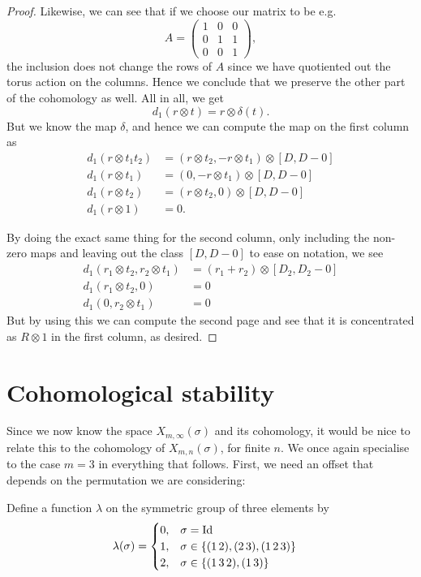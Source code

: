 \begin{proof}
  Likewise, we can see that if we choose our matrix to be e.g.
  \[ A = \begin{pmatrix}
    1 & 0 & 0 \\
    0 & 1 & 1 \\
    0 & 0 & 1
  \end{pmatrix}, \]
  the inclusion does not change the rows of $A$ since we have
  quotiented out the torus action on the columns. Hence we conclude
  that we preserve the other part of the cohomology as well. All in
  all, we get
  \[ d_1(r\otimes t) = r \otimes \delta(t). \]
  But we know the map $\delta$, and hence we can compute the map on
  the first
  column as
  \begin{align*}
    d_1(r \otimes t_1t_2) &= ( r\otimes t_2, - r\otimes t_1) \otimes
    [D,D-0] \\
    d_1(r \otimes t_1) &= (0, -r\otimes t_1) \otimes [D,D-0] \\
    d_1(r \otimes t_2) &= (r\otimes t_2,0) \otimes [D,D-0] \\
    d_1(r \otimes 1) &= 0.
  \end{align*}

  By doing the exact same thing for the second column, only including
  the non-zero maps and leaving out
  the class $[D,D-0]$ to ease on notation, we see
  \begin{align*}
    d_1( r_1\otimes t_2, r_2\otimes t_1) &= (r_1 + r_2) \otimes
                                           [D_2,D_2-0] \\
    d_1( r_1 \otimes t_2, 0) &= 0 \\
    d_1( 0, r_2\otimes t_1) &= 0
  \end{align*} 
  But by using this we can compute the second page and see that it is
  concentrated as $R\otimes 1$ in the first column, as desired.
\end{proof}


\section{Cohomological stability}
\label{sec:costa}
Since we now know the space $X_{m,\infty}(\sigma)$ and its cohomology, it
would be nice to relate this to the cohomology of
$X_{m,n}(\sigma)$, for finite $n$. We once again specialise to the
case $m = 3$ in
everything that
follows. First, we need an offset that depends on the permutation
we are considering:
\begin{definition}
  Define a function $\lambda$ on the symmetric group of three elements
  by
  \begin{align*}
    \lambda(\sigma) &=
                      \begin{cases}
                        0, & \sigma = \operatorname{Id} \\
                        1, & \sigma \in \left\{ (1\,2),(2\,3),(1\,2\,3) \right\}
                        \\
                        2, & \sigma \in \left\{ (1\,3\,2), (1\,3) \right\}
                      \end{cases}
  \end{align*}
\end{definition}

